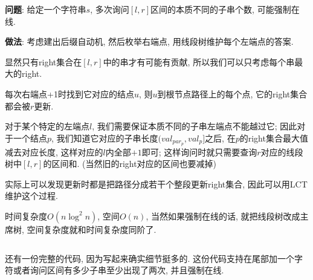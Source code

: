 \textbf{问题}: 给定一个字符串$s$, 多次询问$[l, r]$区间的本质不同的子串个数, 可能强制在线.

\textbf{做法}: 考虑建出后缀自动机, 然后枚举右端点, 用线段树维护每个左端点的答案.

显然只有right集合在$[l, r]$中的串才有可能有贡献, 所以我们可以只考虑每个串最大的right.

每次右端点+1时找到它对应的结点$u$, 则$u$到根节点路径上的每个点, 它的right集合都会被$r$更新.

对于某个特定的左端点$l$, 我们需要保证本质不同的子串左端点不能越过它; 因此对于一个结点$p$, 我们知道它对应的子串长度$(val_{par_p}, val_p]$之后, 在$p$的right集合最大值减去对应长度, 这样对应的$l$内全部$+1$即可; 这样询问时就只需要查询$r$对应的线段树中$[l, r]$的区间和. (当然旧的right对应的区间也要减掉)

实际上可以发现更新时都是把路径分成若干个整段更新right集合, 因此可以用LCT维护这个过程.

时间复杂度$O(n\log ^ 2 n)$, 空间$O(n)$, 当然如果强制在线的话, 就把线段树改成主席树, 空间复杂度就和时间复杂度同阶了.

\inputminted{cpp}{../src/string/samlct.cpp}

还有一份完整的代码, 因为写起来确实细节挺多的. 这份代码支持在尾部加一个字符或者询问区间有多少子串至少出现了两次, 并且强制在线.

\inputminted{cpp}{../src/string/samlct2.cpp}